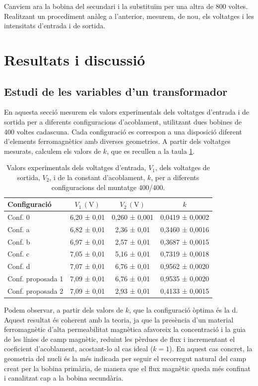 \documentclass[a4paper,10.5pt]{report}
\begin{document}
Canviem ara la bobina del secundari i la substituïm per una altra de 800 voltes. Realitzant un procediment anàleg a l'anterior, mesurem, de nou, els voltatges i les intensitats d'entrada i de sortida.

\section{Resultats i discussió}
\subsection{Estudi de les variables d'un transformador}
En aquesta secció mesurem els valors experimentals dels voltatges d’entrada i de sortida per a diferents configuracions d’acoblament, utilitzant dues bobines de 400 voltes cadascuna. Cada configuració es correspon a una disposició diferent d’elements ferromagnètics amb diverses geometries. A partir dels voltatges mesurats, calculem els valors de $k$, que es recullen a la taula \ref{tab:4.1}.

\begin{table}[h]
	\centering
	\renewcommand{\arraystretch}{1.2}
	\caption{Valors experimentals dels voltatges d'entrada, $V_1$, dels voltatges de sortida, $V_2$, i de la constant d'acoblament, $k$, per a diferents configuracions del muntatge 400/400.}
	\begin{tabular}{lccc}
		\toprule
		Configuració & $V_1 \,(\mathrm{V})$ & $V_2 \,(\mathrm{V})$ & $k$ \\
		\midrule
		Conf. 0     & 6,20 ± 0,01 & 0,260 ± 0,001 & 0,0419 ± 0,0002 \\
		Conf. a     & 6,82 ± 0,01 & 2,36 ± 0,01   & 0,3460 ± 0,0016 \\
		Conf. b     & 6,97 ± 0,01 & 2,57 ± 0,01   & 0,3687 ± 0,0015 \\
		Conf. c     & 7,05 ± 0,01 & 5,16 ± 0,01   & 0,7319 ± 0,0018 \\
		Conf. d     & 7,07 ± 0,01 & 6,76 ± 0,01   & 0,9562 ± 0,0020 \\
		Conf. proposada 1  & 7,09 ± 0,01 & 6,76 ± 0,01   & 0,9535 ± 0,0020 \\
		Conf. proposada 2  & 7,09 ± 0,01 & 2,93 ± 0,01   & 0,4133 ± 0,0015 \\
		\bottomrule
	\end{tabular}
	\label{tab:4.1}
\end{table}


Podem observar, a partir dels valors de $k$, que la configuració òptima és la d. Aquest resultat és coherent amb la teoria, ja que la presència d’un material ferromagnètic d’alta permeabilitat magnètica afavoreix la concentració i la guia de les línies de camp magnètic, reduint les pèrdues de flux i incrementant el coeficient d’acoblament, acostant-lo al cas ideal ($k = 1$). En aquest cas concret, la geometria del nucli és la més indicada per seguir el recorregut natural del camp creat per la bobina primària, de manera que el flux magnètic queda més confinat i canalitzat cap a la bobina secundària.
\end{document}
